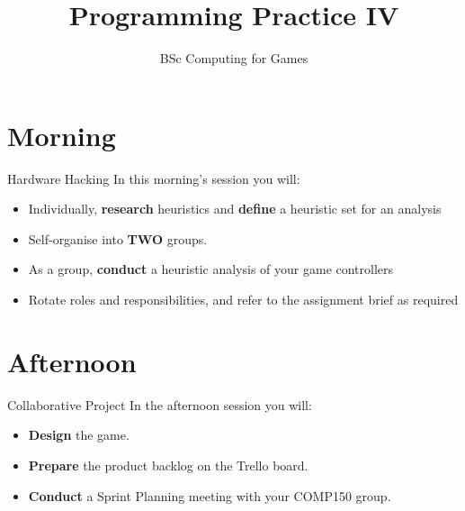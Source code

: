 \documentclass[xcolor={dvipsnames}]{beamer}\usepackage{etoolbox}\newtoggle{printable}\togglefalse{printable}
\begin{document}
\title{Programming Practice IV}   
\subtitle{BSc Computing for Games}

\frame{\titlepage} 

\part{Morning}
\frame{\partpage}

\begin{frame}{Hardware Hacking}
	In this morning's session you will:
	
	\begin{itemize}
		\item Individually, \textbf{research} heuristics and \textbf{define} a heuristic set for an analysis
		\item Self-organise into \textbf{TWO} groups.
		\item As a group, \textbf{conduct} a heuristic analysis of your game controllers
		\item Rotate roles and responsibilities, and refer to the assignment brief as required
	\end{itemize}
\end{frame}

\part{Afternoon}
\frame{\partpage}

\begin{frame}{Collaborative Project}
	In the afternoon session you will:
	
	\begin{itemize}
		\item \textbf{Design} the game.
		\item \textbf{Prepare} the product backlog on the Trello board.
		\item \textbf{Conduct} a Sprint Planning meeting with your COMP150 group.
	\end{itemize}
\end{frame}


%
\end{document}
